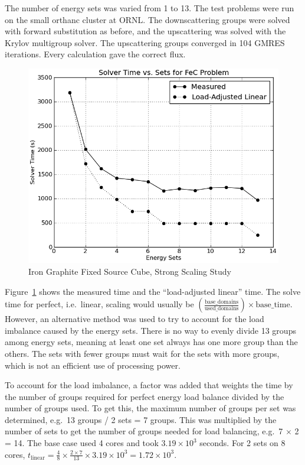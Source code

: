 The number of energy sets was varied from 1 to 13. The test problems were run on the small orthanc cluster at ORNL.  The downscattering groups were solved with forward substitution as before, and the upscattering was solved with the Krylov multigroup solver. The upscattering groups converged in 104 GMRES iterations. Every calculation gave the correct flux.

\begin{figure}[!h]
  \begin{center}
    \includegraphics [width=.75\textwidth, height=0.45\textheight ] {FeCKrylovMultisets}
  \end{center}
  \caption{Iron Graphite Fixed Source Cube, Strong Scaling Study}
  \label{fig:FeGraphiteStudy}
\end{figure}
%
Figure~\ref{fig:FeGraphiteStudy} shows the measured time and the ``load-adjusted linear'' time. The solve time for perfect, i.e.\ linear, scaling would usually be $(\frac{\text{base\_domains}}{\text{used\_domains}}) \times \text{base\_time}$. However, an alternative method was used to try to account for the load imbalance caused by the energy sets. There is no way to evenly divide 13 groups among energy sets, meaning at least one set always has one more group than the others. The sets with fewer groups must wait for the sets with more groups, which is not an efficient use of processing power. 

To account for the load imbalance, a factor was added that weights the time by the number of groups required for perfect energy load balance divided by the number of groups used. To get this, the maximum number of groups per set was determined, e.g.\ 13 groups / 2 sets = 7 groups. This was multiplied by the number of sets to get the number of groups needed for load balancing, e.g.\ 7 $\times$ 2 = 14. The base case used 4 cores and took $3.19 \times 10^{3}$ seconds. For 2 sets on 8 cores, $t_{\text{linear}} = \frac{4}{8}\times\frac{2\times7}{13} \times 3.19 \times 10^{3} = 1.72 \times 10^{3}$.

